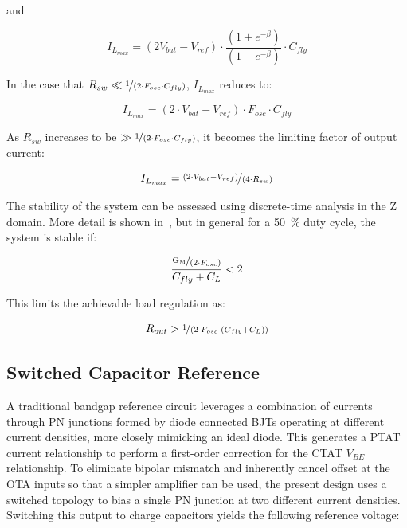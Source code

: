 \documentclass[11pt,letterpaper]{article}
\begin{document}
and

\begin{equation}
    I_{L_{max}} = (2 V_{bat} - V_{ref})\cdot \frac{(1 + e^{-\beta})}{(1 - e^{-\beta})}\cdot C_{fly} \label{eq:iout}
\end{equation}

In the case that \(R_{sw} \ll \nicefrac{1}{(2\cdot F_{osc}\cdot C_{fly})}\), \(I_{L_{max}}\) reduces to:

\begin{equation}
    I_{L_{max}} = (2\cdot V_{bat} - V_{ref})\cdot F_{osc}\cdot C_{fly}\label{eq:iout_smallr}
\end{equation}

As \(R_{sw}\) increases to be \(\gg \nicefrac{1}{(2\cdot F_{osc}\cdot C_{fly})}\), it becomes the limiting factor of output current:

\begin{equation}
    I_{L_{max}} = \nicefrac{(2\cdot V_{bat} - V_{ref})}{(4\cdot R_{sw})}\label{eq:iout_bigr}
\end{equation}

The stability of the system can be assessed using discrete-time analysis in the Z domain. More detail is shown in~\cite{Gregiore2006}, but in general for a \qty{50}{\%} duty cycle, the system is stable if:

\begin{equation}
    \frac{\nicefrac{\mathrm{G_M}}{(2\cdot F_{osc})}}{C_{fly} + C_L} < 2 \label{eq:stb}
\end{equation}

This limits the achievable load regulation as:

\begin{equation}
    R_{out} > \nicefrac{1}{(2\cdot F_{osc}\cdot (C_{fly} + C_L))} \label{eq:rout}
\end{equation}

\subsection{Switched Capacitor Reference}

A traditional bandgap reference circuit leverages a combination of currents through PN junctions formed by diode connected BJTs operating at different current densities, more closely mimicking an ideal diode. This generates a PTAT current relationship to perform a first-order correction for the CTAT \(V_{BE}\) relationship. To eliminate bipolar mismatch and inherently cancel offset at the OTA inputs so that a simpler amplifier can be used, the present design uses a switched topology to bias a single PN junction at two different current densities. Switching this output to charge capacitors yields the following reference voltage:
\end{document}
